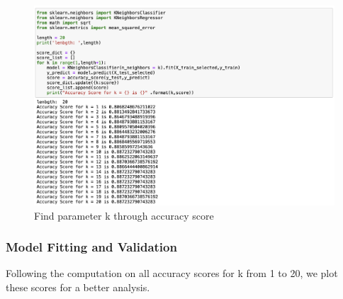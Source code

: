 \documentclass[12pt]{article} %
\theoremstyle{definition}
\begin{document}
\begin{figure}[h!]
    \centering
    \includegraphics[width=0.8\linewidth]{KNN/parameterK.png}
    \caption{Find parameter k through accuracy score}
\end{figure}


\subsubsection{Model Fitting and Validation}
Following the computation on all accuracy scores for k from 1 to 20, we plot these scores for a better analysis.
\end{document}
